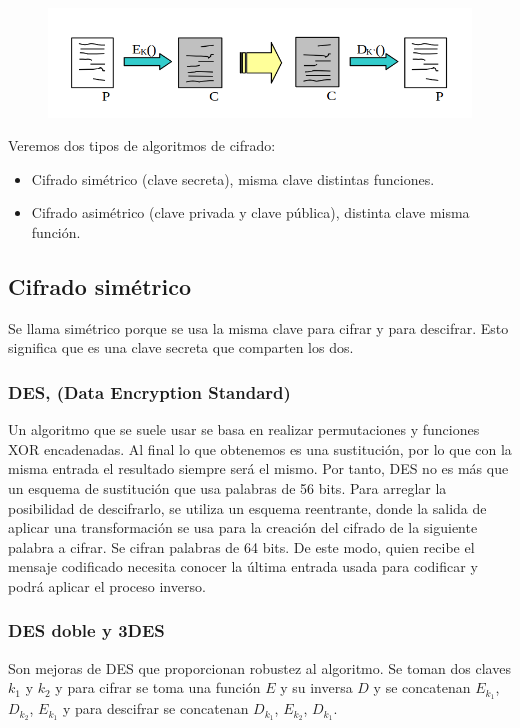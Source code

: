 \begin{figure}[H]
    \centering
    \includegraphics[width=1\linewidth]{./images/cifrado.png}
    \label{fig:cifrado/descifrado}
\end{figure}

Veremos dos tipos de algoritmos de cifrado:
\begin{itemize}
    \item Cifrado simétrico (clave secreta), misma clave distintas funciones.
    \item Cifrado asimétrico (clave privada y clave pública), distinta clave misma función. 
\end{itemize}

\subsection{Cifrado simétrico}

Se llama simétrico porque se usa la misma clave para cifrar y para descifrar. Esto significa que es una clave secreta que comparten los dos.

\subsubsection{DES\@, (Data Encryption Standard)}
Un algoritmo que se suele usar se basa en realizar permutaciones y funciones XOR encadenadas. Al final lo que obtenemos es una sustitución, por lo que con la misma entrada el resultado siempre será el mismo. Por tanto, DES no es más que un esquema de sustitución que usa palabras de 56 bits. Para arreglar la posibilidad de descifrarlo, se utiliza un esquema reentrante, donde la salida de aplicar una transformación se usa para la creación del cifrado de la siguiente palabra a cifrar. Se cifran palabras de 64 bits. De este modo, quien recibe el mensaje codificado necesita conocer la última entrada usada para codificar y podrá aplicar el proceso inverso. 
\subsubsection{DES doble y 3DES\@}
Son mejoras de DES que proporcionan robustez al algoritmo. Se toman dos claves $k_1$ y $k_2$ y para cifrar se toma una función $E$ y su inversa $D$ y se concatenan $E_{k_1}$, $D_{k_2}$, $E_{k_1}$ y para descifrar se concatenan $D_{k_1}$, $E_{k_2}$, $D_{k_1}$. 
